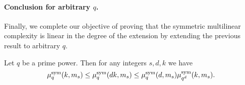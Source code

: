 \paragraph{Conclusion for arbitrary $q$.}
Finally, we complete our objective of proving that the symmetric multilinear
complexity is linear in the degree of the extension by extending the previous
result to arbitrary $q$.

%

\begin{lm}
\label{lemma:basechange}
Let $q$ be a prime power. Then for any integers $s,d,k$ we have
\[ \mu^{\textrm{sym}}_q(k,m_s)\leq\mu^{\textrm{sym}}_q(dk,m_s)\leq\mu^{\textrm{sym}}_q(d,m_s)\mu^{\textrm{sym}}_{q^d}(k,m_s). \]
\end{lm}
